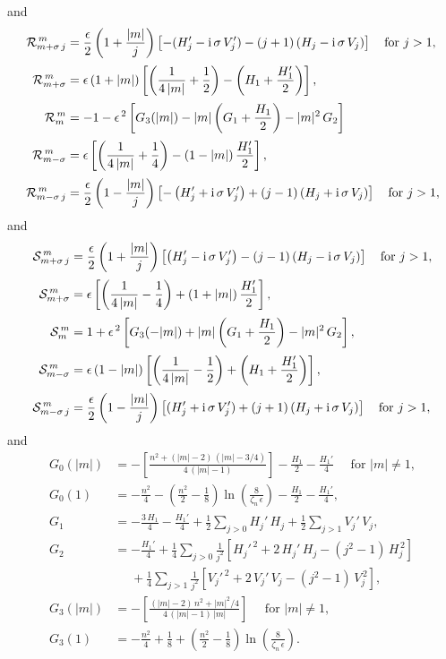 \documentclass[12pt,prb,aps]{revtex4-1}
\begin{document}
and
\begin{align}
{\cal R}_{m+\sigma\,j}^{\,m}  &=\frac{\epsilon}{2}\left(1+\frac{|m|}{j}\right)\left[-(H_j'-{\rm i}\,\sigma\,V_j')-(j+1)\left(H_j-{\rm i}\,\sigma\,V_j\right)\right]\mbox{~~~for $j>1$},\\[0.5ex]
{\cal R}_{m+\sigma}^{\,m} &=\epsilon\,(1+|m|)\left[\left(\frac{1}{4\,|m|}+\frac{1}{2}\right)-\left(H_1+\frac{H_1'}{2}\right)\right],\\[0.5ex]
{\cal R}_m^{\,m} &= -1-\epsilon^{\,2}\left[G_3 (|m|)- |m|\left(G_1+\frac{H_1}{2}\right)- |m|^2\,G_2\right]\,\\[0.5ex]
{\cal R}_{m-\sigma}^{\,m} &=\epsilon\left[\left(\frac{1}{4\,|m|}+\frac{1}{4}\right)
-(1-|m|)\,\frac{H_1'}{2}\right],\\[0.5ex]
{\cal R}_{m-\sigma\,j}^{\,m} &= \frac{\epsilon}{2}\left(1-\frac{|m|}{j}\right)\left[-\left(H_j'+{\rm i}\,\sigma\,V_j'\right)+(j-1)\left(
H_j+{\rm i}\,\sigma\,V_j\right)\right]\mbox{~~~for $j>1$},
\end{align}
and 
\begin{align}
{\cal S}_{m+\sigma\,j}^{\,m}  &=\frac{\epsilon}{2}\left(1+\frac{|m|}{j}\right)\left[\left(H_j'-{\rm i}\,\sigma\,V_j'\right)-(j-1)\left(
H_j-{\rm i}\,\sigma\,V_j\right)\right]\mbox{~~~for $j>1$}, \\[0.5ex]
{\cal S}_{m+\sigma}^{\,m} &= \epsilon\left[\left(\frac{1}{4\,|m|}-\frac{1}{4}\right)
+(1+|m|)\,\frac{H_1'}{2}\right],\\[0.5ex]
{\cal S}_m^{\,m} &=1+\epsilon^{\,2}\left[G_3 (-|m|)+ |m|\left(G_1+\frac{H_1}{2}\right)- |m|^2\,G_2\right],\\[0.5ex]
{\cal S}_{m-\sigma}^{\,m} &=\epsilon\,(1-|m|)\left[\left(\frac{1}{4\,|m|}-\frac{1}{2}\right)+\left(H_1+\frac{H_1'}{2}\right)\right], \\[0.5ex]
{\cal S}_{m-\sigma\,j}^{\,m} &=\frac{\epsilon}{2}\left(1-\frac{|m|}{j}\right)\left[(H_j'+{\rm i}\,\sigma\,V_j')+(j+1)\left(H_j+{\rm i}\,\sigma\,V_j\right)\right]\mbox{~~~for $j>1$},
\end{align}
and 
\begin{align}
G_0(|m|) &= -\left[\frac{n^2+(|m|-2)\,(|m|-3/4)}{4\,(|m|-1)}\right]-\frac{H_1}{2}-\frac{H_1'}{4}\mbox{~~~~for $|m|\neq 1$},\\[0.5ex]
G_0(1) &= -\frac{n^2}{4}-\left(\frac{n^2}{2}-\frac{1}{8}\right)\ln\left(\frac{8}{\zeta_n\,\epsilon}\right)-\frac{H_1}{2}-\frac{H_1'}{4},\\[0.5ex]
G_1  &= -\frac{3\,H_1}{4} - \frac{H_1'}{4} + \frac{1}{2}\sum_{j>0}H_j'\,H_j+ \frac{1}{2}\sum_{j>1}V_j'\,V_j,\\[0.5ex]
G_2 &= -\frac{H_1'}{4}+\frac{1}{4}\sum_{j>0}\frac{1}{j^2}\left[H_j'^{\,2}+ 2\,H_j'\,H_j - (j^2-1)\,H_j^{\,2}\right]\nonumber\\[0.5ex]&\phantom{=}+\frac{1}{4}\sum_{j>1}\frac{1}{j^2}\left[V_j'^{\,2}+ 2\,V_j'\,V_j - (j^2-1)\,V_j^{\,2}\right],\\[0.5ex]
G_3(|m|)& =- \left[\frac{(|m|-2)\,n^2+ |m|^2/4}{4\,(|m|-1)\,|m|}\right]\mbox{~~~~for $|m|\neq 1$},\\[0.5ex]
G_3(1)&= -\frac{n^2}{4} +\frac{1}{8}+\left(\frac{n^2}{2}-\frac{1}{8}\right)\ln\left(\frac{8}{\zeta_n\,\epsilon}\right).
\end{align}
\end{document}
